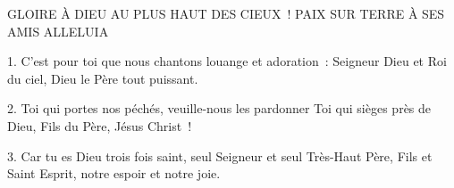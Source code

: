 GLOIRE À DIEU AU PLUS HAUT DES CIEUX !
 PAIX SUR TERRE À SES AMIS ALLELUIA

1. C’est pour toi que nous chantons louange et adoration :
    Seigneur Dieu et Roi du ciel, Dieu le Père tout puissant.

2. Toi qui portes nos péchés, veuille-nous les pardonner
    Toi qui sièges près de Dieu, Fils du Père, Jésus Christ !

3. Car tu es Dieu trois fois saint, seul Seigneur et seul Très-Haut
    Père, Fils et Saint Esprit, notre espoir et notre joie.

